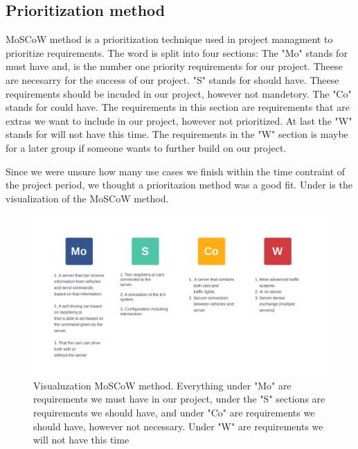 \subsection{Prioritization method}

MoSCoW method is a prioritization technique used in project managment to prioritize requirements. The word is split into four sections: The "Mo" stands for must have and, is the number one priority requirements for our project. Theese are necesarry for the success of our project. "S" stands for should have. Theese requirements should be incuded in our project, however not mandetory. The "Co" stands for could have. The requirements in this section are requirements that are extras we want to include in our project, however not prioritized. At last the "W" stands for will not have this time. The requirements in the "W" section is maybe for a later group if someone wants to further build on our project.

 Since we were unsure how many use cases we finish within the time contraint of the project period, we thought a prioritazion method was a good fit.  Under is the visualization of the MoSCoW method.

\begin{figure}[h!]
	\centering
	\includegraphics[width=1\linewidth]{figures/MosCoW_method}
	\caption[MosCoW method]{Visualuzation MoSCoW method. Everything under "Mo" are requirements we must have in our project, under the "S" sections are requirements we should have, and under "Co" are requirements we should have, however not necessary. Under "W" are requirements we will not have this time}
	\label{fig:moscowmethod}
\end{figure}


